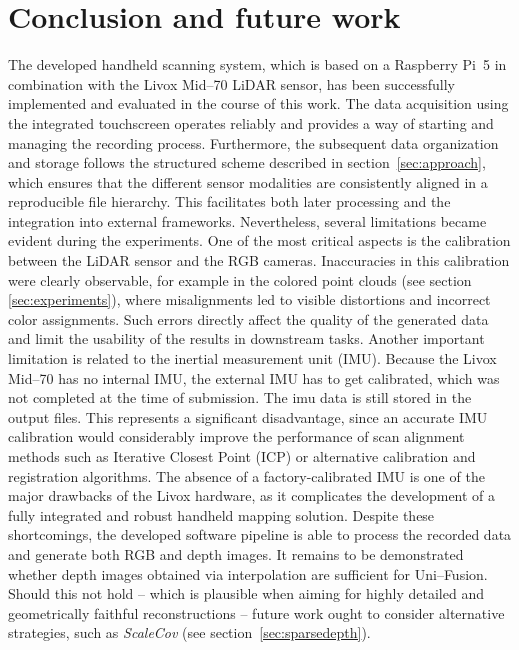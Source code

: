 \documentclass[english, bachelor, utf8]{base/thesis_telematics}
\begin{document}
\chapter{Conclusion and future work}

The developed handheld scanning system, which is based on a Raspberry Pi~5 in combination with the 
Livox Mid--70 LiDAR sensor, has been successfully implemented and evaluated in the course of this work. 
The data acquisition using the integrated touchscreen operates reliably and provides 
a way of starting and managing the recording process. Furthermore, the subsequent data organization and storage 
follows the structured scheme described in section~\ref{sec:approach}, which ensures that the different 
sensor modalities are consistently aligned in a reproducible file hierarchy. This facilitates both later 
processing and the integration into external frameworks. Nevertheless, several limitations became evident 
during the experiments. One of the most critical aspects is the calibration between the LiDAR sensor and 
the RGB cameras. Inaccuracies in this calibration were clearly observable, for example in the colored 
point clouds (see section \ref{sec:experiments}), where misalignments led to visible distortions and incorrect color assignments. Such errors 
directly affect the quality of the generated data and limit the usability of the results in downstream tasks. 
Another important limitation is related to the inertial measurement unit (IMU). 
Because the Livox Mid--70 has no internal IMU, the external IMU has to get calibrated, which 
was not completed at the time of submission. The imu data is still stored in the output files.
This represents a significant disadvantage, since an accurate 
IMU calibration would considerably improve the performance of scan alignment methods such as Iterative 
Closest Point (ICP) or alternative calibration and registration algorithms. The absence of a factory-calibrated 
IMU is one of the major drawbacks of the Livox hardware, as it complicates the development of a fully 
integrated and robust handheld mapping solution. Despite these shortcomings, the developed software 
pipeline is able to process the recorded data and generate both RGB and depth images.
It remains to be demonstrated whether depth images obtained via interpolation are sufficient for Uni--Fusion.
Should this not hold -- which is plausible when aiming for highly detailed and geometrically faithful reconstructions --
future work ought to consider alternative strategies, such as \emph{ScaleCov} (see section~\ref{sec:sparsedepth}).
\end{document}
